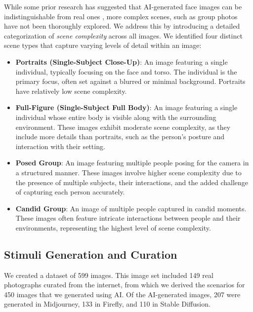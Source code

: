 While some prior research has suggested that AI-generated face images can be indistinguishable from real ones \cite{hulzebosch2020detectingcnngeneratedfacialimages, nightingale2022ai}, more complex scenes, such as group photos have not been thoroughly explored.  We address this by introducing a detailed categorization of \textit{scene complexity} across all images. We identified four distinct scene types that capture varying levels of detail within an image:
 \begin{itemize}[leftmargin=*, label=\tiny{$\bullet$}]
    \item \textbf{Portraits (Single-Subject Close-Up)}: An image featuring a single individual, typically focusing on the face and torso. The individual is the primary focus, often set against a blurred or minimal background. Portraits have relatively low scene complexity.
    
     \item \textbf{Full-Figure (Single-Subject Full Body)}: An image featuring a single individual whose entire body is visible along with the surrounding environment. These images exhibit moderate scene complexity, as they include more details than portraits, such as the person's posture and interaction with their setting.
         
     \item \textbf{Posed Group}: An image featuring multiple people posing for the camera in a structured manner. These images involve higher scene complexity due to the presence of multiple subjects, their interactions, and the added challenge of capturing each person accurately. 
    
     \item \textbf{Candid Group}: An image of multiple people captured in candid moments. These images often feature intricate interactions between people and their environments, representing the highest level of scene complexity.
 \end{itemize}

\subsection{Stimuli Generation and Curation} \label{sec:curation}
We created a dataset of 599 images. This image set included 149 real photographs curated from the internet, from which we derived the scenarios for 450 images that we generated using AI. Of the AI-generated images, 207 were generated in Midjourney, 133 in Firefly, and 110 in Stable Diffusion. 

